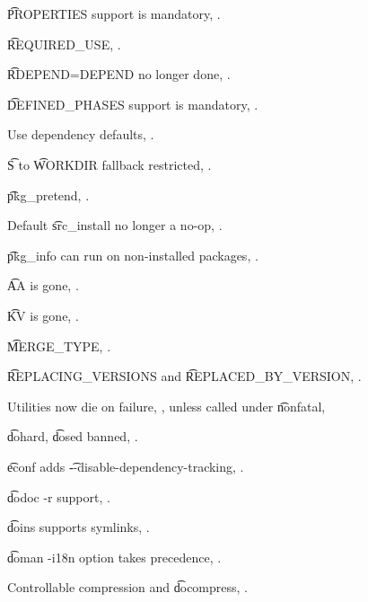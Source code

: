\begin{compactitem}
\item \t{PROPERTIES} support is mandatory, .
\item \t{REQUIRED\_USE}, .
\item \t{RDEPEND=DEPEND} no longer done, .
\item \t{DEFINED\_PHASES} support is mandatory, .
\item Use dependency defaults, .
\item \t{S} to \t{WORKDIR} fallback restricted, .
\item \t{pkg\_pretend}, .
\item Default \t{src\_install} no longer a no-op, .
\item \t{pkg\_info} can run on non-installed packages, .
\item \t{AA} is gone, .
\item \t{KV} is gone, .
\item \t{MERGE\_TYPE}, .
\item \t{REPLACING\_VERSIONS} and \t{REPLACED\_BY\_VERSION}, .
\item Utilities now die on failure, , unless called under \t{nonfatal},
\item \t{dohard}, \t{dosed} banned, .
\item \t{econf} adds \t{-{}-disable-dependency-tracking}, .
\item \t{dodoc -r} support, .
\item \t{doins} supports symlinks, .
\item \t{doman -i18n} option takes precedence, .
\item Controllable compression and \t{docompress}, .
\end{compactitem}


